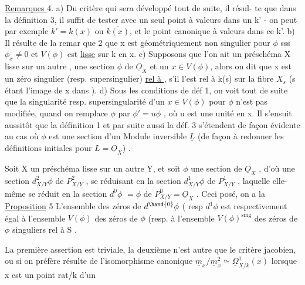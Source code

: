 
\uline{Remarques }4. a) Du  critère qui sera développé tout de suite, il résul-%
te que dans la définition 3, il suffit de tester avec un seul point
à valeurs dans un k' - on peut par exemple  $k'=k(x)$ ou $\overline{k(x)}$, et
le point canonique à valeurs dans ce k'. b) Il résulte de la remar
que 2 que x est géométriquement non singulier pour $\phi$ sss $\phi_x \neq 0$ et
$V(\phi)$ est \uline{lisse} sur k en x. c) Supposons que l'on ait un préschéma X lisse
sur un autre , une section $\phi$ de $\underline{O}_X$ et un $x \in V(\phi)$, alors on dit que x
est un zéro singulier (resp. supersingulier) \uline{rel à }, s'il l'est
rel à k(s) sur la fibre $X_s$ (s étant l'image de x dans ). d) Sous
les conditions de déf 1, on voit tout de suite que la singularité resp.
\placedmargin{$\|$} supersingularité d'un $x \in V(\phi)$ pour $\phi$ n'est pas modifiée, quand on
remplace $\phi$ par $\phi'=u\phi$ , où u est une unité en x. Il s'ensuit aussitôt que
la  définition 1 et par suite aussi la déf. 3 s'étendent de façon
évidente au cas où $\phi$ est une section d'un Module inversible $\underline{L}$ (de façon
à redonner les définitions initiales pour $L = \underline{O}_X$) .

 Soit X un préschéma lisse sur un
autre Y, et soit $\phi$ une section de $\underline{O}_X$ , d'où une section $d^2_{X/Y}\phi$ de
$P^2_{X/Y}$ , se réduisant en la section $d^1_{X/Y}\phi$ de $P^1_{X/Y}$ , laquelle elle-même
se réduit en la section $d^0\phi$ $=\phi$ de $P^0_{X/Y} = \underline{O}_X$ . Ceci posé, on a la
\uline{Proposition} 5 L'ensemble des zéros de $d^{\hand{0}}\phi$ ( resp $d^1\phi$ \hand{)} 
 est respectivement égal à l'ensemble $V(\phi)$ des zéros de $\phi$ (resp. à
l'ensemble $V(\phi)^{\mathrm{sing}}$ des zéros de $\phi$ singuliers rel à S\hand{)} 
.

La première assertion est triviale, la deuxième n'est autre
que le critère jacobien, ou si on préfère résulte de l'isomorphisme
canonique $\underline{m}_x/\underline{m}_x^2 \simeq \underline{\Omega}^1_{X/k}(x)$ lorsque x est un point rat/k d'un

